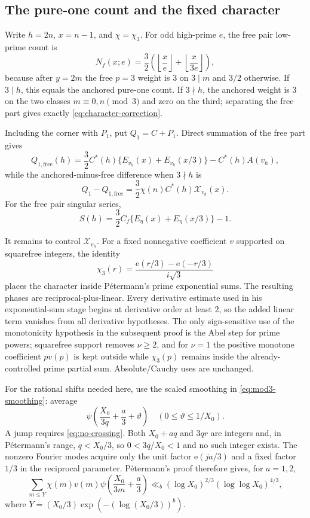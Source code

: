 \documentclass[11pt]{article}
\theoremstyle{definition}
\theoremstyle{remark}
\newcommand{\Xcal}{\mathcal X}
\newcommand{\e}{\mathrm e}
\newcommand{\1}{\mathbf 1}
\newcommand{\free}{\mathrm{free}}
\begin{document}
\subsection{The pure-one count and the fixed character}
Write $h=2n$, $x=n-1$, and $\chi=\chi_3$.  For odd high-prime $e$, the free pair low-prime count is
\[
N_f(x;e)=\frac32\left(\left\lfloor\frac xe\right\rfloor+
\left\lfloor\frac{x}{3e}\right\rfloor\right),
\]
because after $y=2m$ the free $p=3$ weight is $3$ on $3\mid m$ and $3/2$ otherwise.  If $3\mid h$, this equals the anchored pure-one count.  If $3\nmid h$, the anchored weight is $3$ on the two classes
$m\equiv0,n\pmod3$ and zero on the third; separating the free part gives exactly \cref{eq:character-correction}.

Including the corner with $P_1$, put $Q_1=C+P_1$.  Direct summation of the free part gives
\begin{equation}\label{eq:app-Q1free}
Q_{1,\free}(h)
=\frac32C^*(h)\{E_{v_h}(x)+E_{v_h}(x/3)\}
-C^*(h)A(v_h),
\end{equation}
while the anchored-minus-free difference when $3\nmid h$ is
\begin{equation}\label{eq:app-Q1char}
Q_1-Q_{1,\free}
=\frac32\chi(n)C^*(h)\Xcal_{v_h}(x).
\end{equation}
For the free pair singular series,
\begin{equation}\label{eq:app-Sfree}
S(h)=\frac32C_f\{E_\eta(x)+E_\eta(x/3)\}-1.
\end{equation}

It remains to control $\Xcal_{v_h}$.  For a fixed nonnegative coefficient $v$ supported on squarefree integers, the identity
\[
\chi_3(r)=\frac{\e(r/3)-\e(-r/3)}{i\sqrt3}
\]
places the character inside P\'etermann's prime exponential sums.  The resulting phases are reciprocal-plus-linear.  Every derivative estimate used in his exponential-sum stage begins at derivative order at least $2$, so the added linear term vanishes from all derivative hypotheses.  The only sign-sensitive use of the monotonicity hypothesis in the subsequent proof is the Abel step for prime powers; squarefree support removes $\nu\ge2$, and for $\nu=1$ the positive monotone coefficient $pv(p)$ is kept outside while $\chi_3(p)$ remains inside the already-controlled prime partial sum.  Absolute/Cauchy uses are unchanged.

For the rational shifts needed here, use the scaled smoothing in \cref{eq:mod3-smoothing}: average
\[
\psi\!\left(\frac{X_0}{3q}+\frac a3+\vartheta\right)
\quad(0\le\vartheta\le1/X_0).
\]
A jump requires \cref{eq:no-crossing}.  Both $X_0+aq$ and $3qr$ are integers and, in P\'etermann's range, $q<X_0/3$, so $0<3q/X_0<1$ and no such integer exists.  The nonzero Fourier modes acquire only the unit factor $\e(ja/3)$ and a fixed factor $1/3$ in the reciprocal parameter.  P\'etermann's proof therefore gives, for $a=1,2$,
\begin{equation}\label{eq:app-shifted-petermann}
\sum_{m\le Y}\chi(m)v(m)
\psi\!\left(\frac{X_0}{3m}+\frac a3\right)
\ll_b(\log X_0)^{2/3}(\log\log X_0)^{4/3},
\end{equation}
where $Y=(X_0/3)\exp(- (\log(X_0/3))^b)$.
\end{document}
